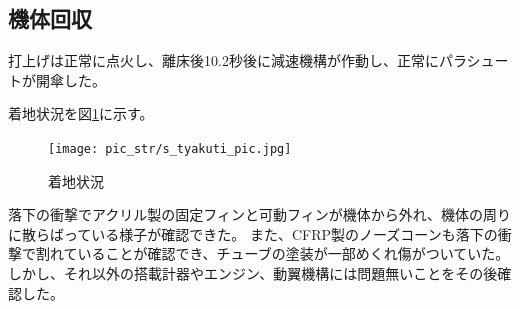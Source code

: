 \documentclass[a4paper,11pt,titlepage,uplatex]{jsarticle}
\begin{document}
\subsection{機体回収}
打上げは正常に点火し、離床後10.2秒後に減速機構が作動し、正常にパラシュートが開傘した。

着地状況を図\ref{s_tyakuti_pic}に示す。
\begin{figure}[H]
    \centering
    \texttt{[image: pic\_str/s\_tyakuti\_pic.jpg]}
    \caption{着地状況}
    \label{s_tyakuti_pic}
\end{figure}

落下の衝撃でアクリル製の固定フィンと可動フィンが機体から外れ、機体の周りに散らばっている様子が確認できた。
また、CFRP製のノーズコーンも落下の衝撃で割れていることが確認でき、チューブの塗装が一部めくれ傷がついていた。
しかし、それ以外の搭載計器やエンジン、動翼機構には問題無いことをその後確認した。
\end{document}
